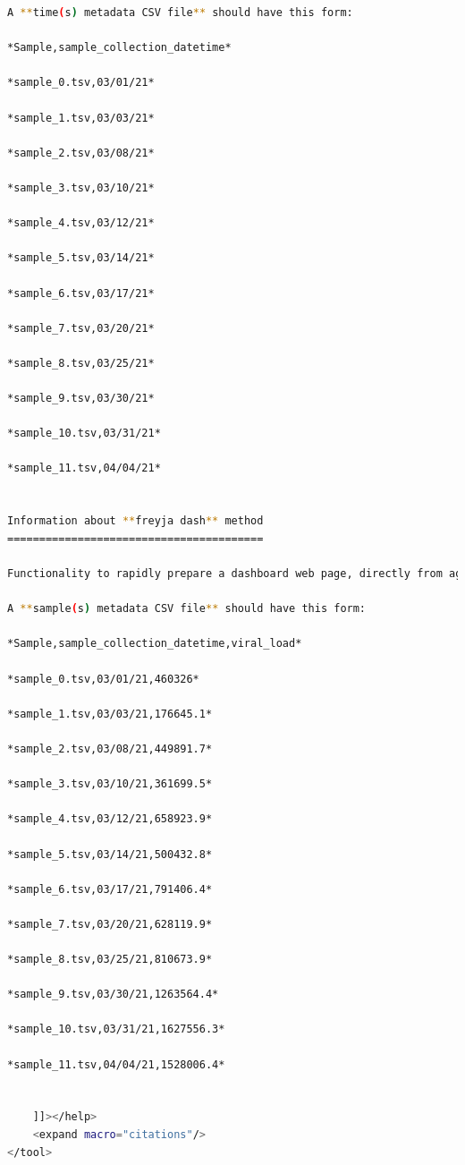 \begin{lstlisting}[language=bash, caption=tool wrapper for Freyja: Aggregate and visualize demixed results, label=list:methods:wrapper-freyja-agg]
A **time(s) metadata CSV file** should have this form:

*Sample,sample_collection_datetime*  

*sample_0.tsv,03/01/21*  

*sample_1.tsv,03/03/21*  
 
*sample_2.tsv,03/08/21*  

*sample_3.tsv,03/10/21*  

*sample_4.tsv,03/12/21*  

*sample_5.tsv,03/14/21*  

*sample_6.tsv,03/17/21*  

*sample_7.tsv,03/20/21*  

*sample_8.tsv,03/25/21*  

*sample_9.tsv,03/30/21*  

*sample_10.tsv,03/31/21*  

*sample_11.tsv,04/04/21*


Information about **freyja dash** method
========================================

Functionality to rapidly prepare a dashboard web page, directly from aggregated freyja output.

A **sample(s) metadata CSV file** should have this form:

*Sample,sample_collection_datetime,viral_load*  

*sample_0.tsv,03/01/21,460326*  

*sample_1.tsv,03/03/21,176645.1*  

*sample_2.tsv,03/08/21,449891.7*  

*sample_3.tsv,03/10/21,361699.5*  

*sample_4.tsv,03/12/21,658923.9*  

*sample_5.tsv,03/14/21,500432.8*  

*sample_6.tsv,03/17/21,791406.4*  

*sample_7.tsv,03/20/21,628119.9*  

*sample_8.tsv,03/25/21,810673.9*  

*sample_9.tsv,03/30/21,1263564.4*  

*sample_10.tsv,03/31/21,1627556.3*  

*sample_11.tsv,04/04/21,1528006.4*


    ]]></help>
    <expand macro="citations"/>
</tool>
\end{lstlisting}

